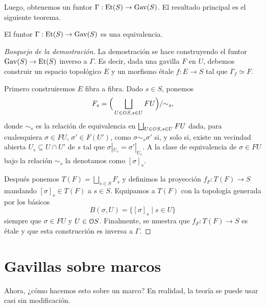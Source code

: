 Luego, obtenemos un funtor $\Gamma:\Et(S)\to\Gav(S)$.
El resultado principal es el siguiente teorema.

\begin{theorem}
    El funtor $\Gamma:\Et(S)\to\Gav(S)$ es una equivalencia.
\end{theorem}
\begin{proof}[Bosquejo de la demostración]
    La demostración se hace construyendo el funtor
    $\Gav(S)\to\Et(S)$ inverso a $\Gamma$.
    Es decir, dada una gavilla $F$ en $U$,
    debemos construir un espacio topológico $E$ y un morfismo
    étale $f:E\to S$ tal que $\Gamma_f\simeq F$.
    
    Primero construiremos $E$ fibra a fibra.
    Dado $s\in S$, ponemos
    \[
        F_s = \Big(\bigsqcup_{U\in\cal OS,s\in U} FU\Big)/\simr_s
    ,\]
    donde $\sim_s$ es la relación de equivalencia en
    $\bigsqcup_{U\in\cal OS,s\in U}FU$ dada,
    para cualesquiera $\sigma\in FU$, $\sigma'\in F(U')$, como
    $\sigma\sim_s\sigma'$ si, y solo si, existe un vecindad abierta
    $U_s\subseteq U\cap U'$ de $s$
    tal que $\sigma|_{U_s}=\sigma'|_{U_s}$.
    A la clase de equivalencia de $\sigma\in FU$ bajo la relación
    $\sim_s$ la denotamos como $[\sigma]_s$.
    
    Después ponemos $T(F)=\bigsqcup_{s\in S}F_s$
    y definimos la proyección $f_F:T(F)\to S$
    mandando $[\sigma]_s\in T(F)$ a $s\in S$.
    Equipamos a $T(F)$ con la topología generada por los básicos
    \[
        B(\sigma,U) = \{[\sigma]_s\mid s\in U\}
    \]
    siempre que $\sigma\in FU$ y $U\in\cal OS$.
    Finalmente, se muestra que $f_F:T(F)\to S$ es étale
    y que esta construcción es inversa a $\Gamma$.
\end{proof}

\section{Gavillas sobre marcos}
Ahora, ¿cómo hacemos esto sobre un marco?
En realidad, la teoría se puede usar casi sin modificación.

